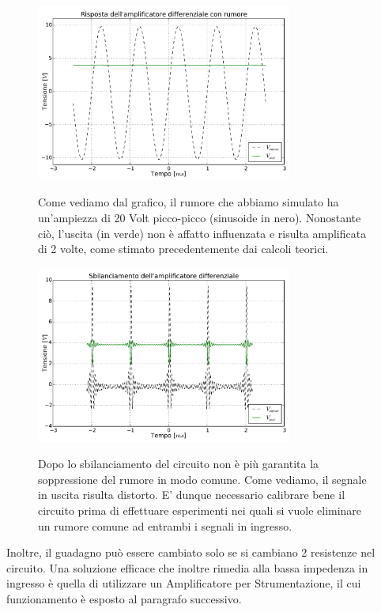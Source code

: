 \begin{figure}[ht]
 \centering
   {\includegraphics[width=0.75\textwidth]{../E05/latex/amp_diff.pdf}}
 \caption{Come vediamo dal grafico, il rumore che abbiamo simulato ha un'ampiezza di 20 Volt picco-picco (sinusoide in nero). Nonostante ciò, l'uscita (in verde) non è affatto influenzata e risulta amplificata di 2 volte, come stimato precedentemente dai calcoli teorici. }
 \label{gr5:amp_diff}
\end{figure}

\begin{figure}[ht]
 \centering
   {\includegraphics[width=0.75\textwidth]{../E05/latex/sbil_amp_diff.pdf}}
 \caption{Dopo lo sbilanciamento del circuito non è più garantita la soppressione del rumore in modo comune. Come vediamo, il segnale in uscita risulta distorto. E' dunque necessario calibrare bene il circuito prima di effettuare esperimenti nei quali si vuole eliminare un rumore comune ad entrambi i segnali in ingresso.}
 \label{gr5:sbil_amp_diff}
\end{figure}

Inoltre, il guadagno può essere cambiato solo se si cambiano 2 resistenze nel circuito. Una soluzione efficace che inoltre rimedia alla bassa impedenza in ingresso è quella di utilizzare un Amplificatore per Strumentazione, il cui funzionamento è esposto al paragrafo successivo.

